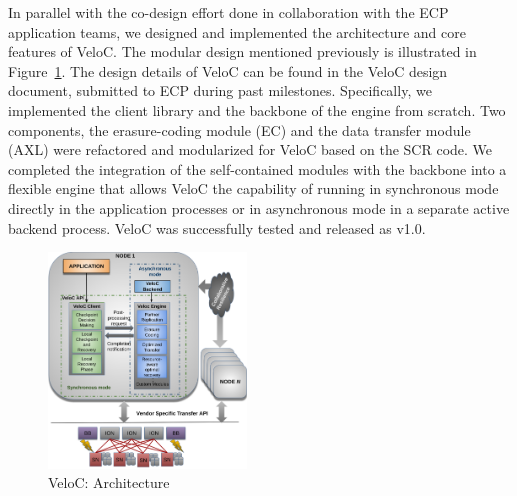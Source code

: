 In parallel with the co-design effort done in collaboration with the
ECP application teams, we designed and implemented the architecture and
core features of VeloC. The modular design mentioned previously is
illustrated in Figure~\ref{fig:veloc:arch}. The design details of
VeloC can be found in the VeloC design document, submitted to ECP
during past milestones. Specifically, we implemented the client
library and the backbone of the engine from scratch. Two components,
the erasure-coding module (EC) and the data transfer module (AXL) were
refactored and modularized for VeloC based on the SCR code. We
completed the integration of the self-contained modules with the
backbone into a flexible engine that allows VeloC the capability of
running in synchronous mode directly in the application processes or
in asynchronous mode in a separate active backend process. VeloC was
successfully tested and released as v1.0.

\begin{figure}
  \includegraphics[width=0.47\textwidth]{projects/2.3.4-DataViz/2.3.4.05-VeloC/veloc-arch}
  \caption{VeloC: Architecture}%
  \label{fig:veloc:arch}%
\end{figure}


